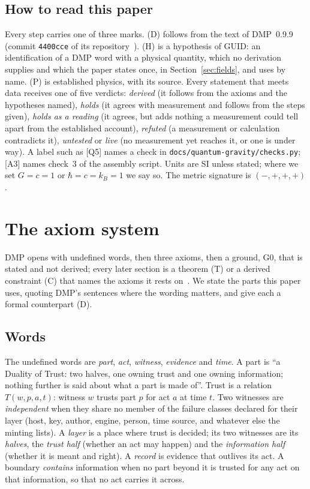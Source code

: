 \documentclass[11pt,a4paper]{article}
\theoremstyle{definition}
\theoremstyle{remark}
\newcommand{\chk}[1]{\textsf{[#1]}}
\newcommand{\tagD}{\textsf{(D)}}
\newcommand{\tagH}{\textsf{(H)}}
\newcommand{\tagP}{\textsf{(P)}}
\theoremstyle{definition}
\begin{document}
\subsection{How to read this paper}

Every step carries one of three marks. \tagD{} follows from the text of DMP~0.9.9 (commit \texttt{4400cce} of its repository~\cite{dmp}).
\tagH{} is a hypothesis of GUID: an identification of a DMP word with a physical quantity, which no derivation supplies and which the
paper states once, in Section~\ref{sec:fields}, and uses by name. \tagP{} is established physics, with its source. Every statement that
meets data receives one of five verdicts: \emph{derived} (it follows from the axioms and the hypotheses named), \emph{holds} (it agrees with
measurement and follows from the steps given), \emph{holds as a reading} (it agrees, but adds nothing a measurement could tell apart from the
established account), \emph{refuted} (a measurement or calculation contradicts it), \emph{untested} or \emph{live} (no measurement yet reaches
it, or one is under way). A label such as \chk{Q5} names a check in \texttt{docs/quantum-gravity/checks.py}; \chk{A3} names check~3 of the
assembly script. Units are SI unless stated; where we set $G=c=1$ or $\hbar=c=k_B=1$ we say so. The metric signature is $(-,+,+,+)$.

\section{The axiom system}\label{sec:dmp}

DMP opens with undefined words, then three axioms, then a ground, G0, that is stated and not derived; every later section is a theorem
(T) or a derived constraint (C) that names the axioms it rests on~\cite{dmp}. We state the parts this paper uses, quoting DMP's sentences
where the wording matters, and give each a formal counterpart \tagD.

\subsection{Words}

The undefined words are \emph{part}, \emph{act}, \emph{witness}, \emph{evidence} and \emph{time}. A part is ``a Duality of Trust: two halves,
one owning trust and one owning information; nothing further is said about what a part is made of''. Trust is a relation $T(w,p,a,t)$:
witness $w$ trusts part $p$ for act $a$ at time $t$. Two witnesses are \emph{independent} when they share no member of the failure classes
declared for their layer (host, key, author, engine, person, time source, and whatever else the minting lists). A \emph{layer} is a place
where trust is decided; its two witnesses are its \emph{halves}, the \emph{trust half} (whether an act may happen) and the
\emph{information half} (whether it is meant and right). A \emph{record} is evidence that outlives its act. A boundary \emph{contains}
information when no part beyond it is trusted for any act on that information, so that no act carries it across.
\end{document}
